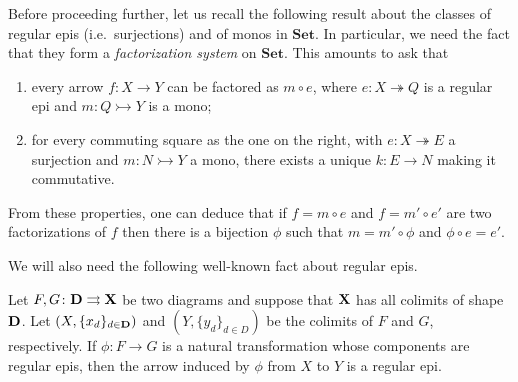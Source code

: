 \documentclass[3p]{elsarticle}
\newcommand{\Set}{\mathbf{Set}}
\def\D{\textbf {\textup{D}}}
\def\X{\textbf {\textup{X}}}
\newcommand{\mto}{\rightarrowtail}
\newcommand{\eto}{\twoheadrightarrow}
\theoremstyle{remark}
\theoremstyle{definition}
\begin{document}
\begin{rem}\label{rem:fact}
	Before proceeding further, let us recall the following result about the classes of regular epis (i.e.~surjections) and of monos in $\Set$. In particular, we need the fact that they form a \emph{factorization system} \cite{kelly2006note} on $\Set$.  This amounts to ask that
	
	\noindent 
	\begin{minipage}[l]{.8\linewidth}
		\begin{enumerate} 
			\item every arrow $f\colon X\to Y$ can be factored as $m\circ e$, where $e\colon X\eto Q$ is a regular epi and $m\colon Q\mto Y$ is a mono;
			\item for every commuting square as the one on the right, with $e\colon X\eto E$ a surjection and $m\colon N\mto Y$ a mono, there exists a unique $k\colon E\to N$ making it commutative.
		\end{enumerate}
	\end{minipage}\hfill
	\begin{minipage}[r]{.2\linewidth}
	\end{minipage}
	
	\hspace{1pt}\newline 
	From these properties, one can deduce that if $f=m\circ e$ and $f=m'\circ e'$ are two factorizations of $f$ then there is a bijection $\phi$ such that $m=m'\circ \phi$ and $\phi \circ e=e'$.
\end{rem}

We will also need the following well-known fact about regular epis.

\begin{lem}\label{lemma:nat_trans_reg_epi_canonical_arrow_reg_epi}
	Let $F,G\colon \D\rightrightarrows \X$ be two diagrams and suppose that $\X$ has all colimits of shape $\D$. Let $(X, \{x_d\}_{d \in \D})$ and $(Y, \{y_d\}_{d\in D})$ be the colimits of $F$ and $G$, respectively.  If $\phi\colon  F \to G$ is a natural transformation whose components are regular epis, then the arrow induced by $\phi$ from $X$ to $Y$ is a regular epi.
\end{lem}
\end{document}
